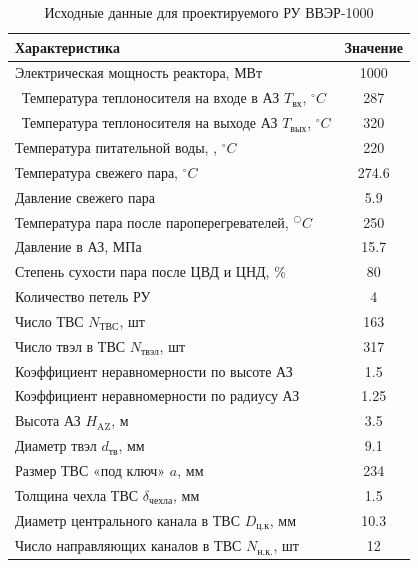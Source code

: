 \begin{table}[H]
	\caption{Исходные данные для проектируемого РУ ВВЭР-1000}
	\begin{center}
        \begin{tabular}{|l|c|}
        \toprule
         Характеристика & Значение \\ 
         \midrule
         \hline
         Электрическая мощность реактора, МВт & 1000 \\
         \hline\ 
         Температура теплоносителя на входе в АЗ $T_{\text{вх}}$, $^\circ C$  & 287 \\ 
         \hline\
         Температура теплоносителя на выходе АЗ $T_{\text{вых}}$, $^\circ C$ & 320 \\ 
         \hline
         Температура питательной воды, , $^\circ C$ & 220 \\ 
         \hline
         Температура свежего пара, $^\circ C$  &  274.6 \\ 
         \hline
         Давление свежего пара & 5.9 \\ 
         \hline
         Температура пара после пароперегревателей, $^○C$ & 250 \\ 
         \hline
         Давление в АЗ, МПа & 15.7 \\ 
         \hline
         Степень сухости пара после ЦВД и ЦНД, \% & 80 \\ 
         \hline
         Количество петель РУ & 4 \\ 
         \hline
         Число ТВС $N_{\text{ТВС}}$, шт  & 163 \\ 
         \hline
         Число твэл в ТВС $N_{\text{твэл}}$, шт & 317 \\ 
         \hline
         Коэффициент неравномерности по высоте АЗ  & 1.5 \\ 
         \hline
         Коэффициент неравномерности по радиусу АЗ & 1.25 \\ 
         \hline
         Высота АЗ $H_{\text{AZ}}$, м & 3.5 \\ 
         \hline
         Диаметр твэл $d_{\text{тв}}$, мм & 9.1 \\ 
         \hline
         Размер ТВС «под ключ» $a$, мм & 234 \\ 
         \hline
         Толщина чехла ТВС $\delta_{\text{чехла}}$, мм & 1.5 \\
         \hline
         Диаметр центрального канала в ТВС $D_{\text{ц.к}}$, мм & 10.3 \\ 
         \hline
         Число направляющих каналов в ТВС $N_{\text{н.к.}}$, шт & 12 \\ 

\end{tabular}
\end{center}
\end{table}
